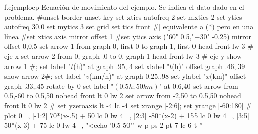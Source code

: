 \begin{plot}{0.9}{f.ejemploep}
  {Ecuación de movimiento del ejemplo. Se indica el dato dado en el problema.}
  #unset border
  unset key
  set xtics autofreq 2
  set mxtics 2
  set ytics autofreq 30.0
  set mytics 3
  set grid
  set tics front    #| equivalente a (*) pero en una línea
  #set xtics axis mirror offset 1
  #set ytics axis ("$60$" 0.5,"$-30$" -0.25) mirror offset 0,0.5
  set arrow 1 from graph 0, first 0 to graph 1, first 0 head front lw 3 # eje x
  set arrow 2 from 0, graph .0 to 0, graph 1 head front lw 3		# eje y 
  show arrow 1 #; set label "$t$(h)" at graph .95,.4
  set xlabel "$t$(h)" offset  graph .46,.39
  show arrow 2#; set label "$v$(km/h)" at graph 0.25,.98 
  set ylabel "$x$(km)" offset graph .33,.45 rotate by 0
  set label "$(0.5h;50km)$" at 0.6,40
  set arrow from 0.5,-60 to 0.5,50 nohead front lt 0 lw 2
  set arrow from -2,50 to 0.5,50 nohead front lt 0 lw 2
  #
  set yzeroaxis lt -4 lc -4
  set xrange [-2:6]; set yrange [-60:180]
  #
  plot  0 \
  , [-1:2] 70*(x-.5) + 50 lc 0 lw 4 \
  , [2:3] -80*(x-2) + 155 lc 0 lw 4 \
  , [3:5] 50*(x-3) + 75 lc 0 lw 4 \
  , "<echo '0.5 50'" w p ps 2 pt 7 lc 6 t '' \
\end{plot}

